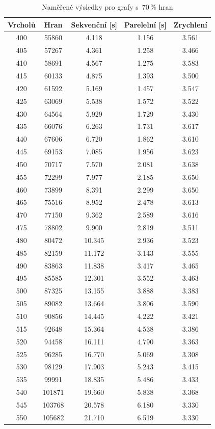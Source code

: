 \documentclass[12pt]{article}
\begin{document}
\begin{table}[H]
\begin{center}
\begin{tabular}{ c c c c c }
\toprule
Vrcholů & Hran & Sekvenční [s] & Parelelní [s] & Zrychlení\\\midrule
400 & 55860 & 4.118 & 1.156 & 3.561\\
405 & 57267 & 4.361 & 1.258 & 3.466\\
410 & 58691 & 4.567 & 1.275 & 3.583\\
415 & 60133 & 4.875 & 1.393 & 3.500\\
420 & 61592 & 5.169 & 1.457 & 3.547\\
425 & 63069 & 5.538 & 1.572 & 3.522\\
430 & 64564 & 5.929 & 1.729 & 3.430\\
435 & 66076 & 6.263 & 1.731 & 3.617\\
440 & 67606 & 6.720 & 1.862 & 3.610\\
445 & 69153 & 7.085 & 1.956 & 3.623\\
450 & 70717 & 7.570 & 2.081 & 3.638\\
455 & 72299 & 7.977 & 2.185 & 3.650\\
460 & 73899 & 8.391 & 2.299 & 3.650\\
465 & 75516 & 8.952 & 2.478 & 3.613\\
470 & 77150 & 9.362 & 2.589 & 3.616\\
475 & 78802 & 9.900 & 2.819 & 3.511\\
480 & 80472 & 10.345 & 2.936 & 3.523\\
485 & 82159 & 11.172 & 3.143 & 3.555\\
490 & 83863 & 11.838 & 3.417 & 3.465\\
495 & 85585 & 12.301 & 3.552 & 3.463\\
500 & 87325 & 13.155 & 3.888 & 3.383\\
505 & 89082 & 13.664 & 3.806 & 3.590\\
510 & 90856 & 14.445 & 4.222 & 3.421\\
515 & 92648 & 15.364 & 4.538 & 3.386\\
520 & 94458 & 16.111 & 4.790 & 3.363\\
525 & 96285 & 16.770 & 5.069 & 3.308\\
530 & 98129 & 17.903 & 5.243 & 3.415\\
535 & 99991 & 18.835 & 5.486 & 3.433\\
540 & 101871 & 19.660 & 5.838 & 3.368\\
545 & 103768 & 20.578 & 6.180 & 3.330\\
550 & 105682 & 21.710 & 6.519 & 3.330\\
\bottomrule
\end{tabular}
\end{center}
\caption{Naměřené výsledky pro grafy s~$70\,\%$ hran} 
\end{table}
\end{document}
